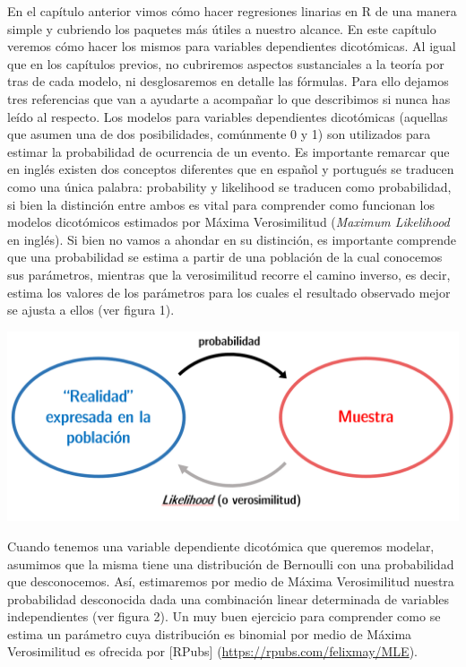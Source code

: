 \documentclass[]{book}
\begin{document}
En el capítulo anterior vimos cómo hacer regresiones linarias en R de
una manera simple y cubriendo los paquetes más útiles a nuestro alcance.
En este capítulo veremos cómo hacer los mismos para variables
dependientes dicotómicas. Al igual que en los capítulos previos, no
cubriremos aspectos sustanciales a la teoría por tras de cada modelo, ni
desglosaremos en detalle las fórmulas. Para ello dejamos tres
referencias que van a ayudarte a acompañar lo que describimos si nunca
has leído al respecto. Los modelos para variables dependientes
dicotómicas (aquellas que asumen una de dos posibilidades, comúnmente 0
y 1) son utilizados para estimar la probabilidad de ocurrencia de un
evento. Es importante remarcar que en inglés existen dos conceptos
diferentes que en español y portugués se traducen como una única
palabra: probability y likelihood se traducen como probabilidad, si bien
la distinción entre ambos es vital para comprender como funcionan los
modelos dicotómicos estimados por Máxima Verosimilitud (\emph{Maximum
Likelihood} en inglés). Si bien no vamos a ahondar en su distinción, es
importante comprende que una probabilidad se estima a partir de una
población de la cual conocemos sus parámetros, mientras que la
verosimilitud recorre el camino inverso, es decir, estima los valores de
los parámetros para los cuales el resultado observado mejor se ajusta a
ellos (ver figura 1).

\includegraphics[width=1.2\linewidth]{00-images/fig_7_1}

Cuando tenemos una variable dependiente dicotómica que queremos modelar,
asumimos que la misma tiene una distribución de Bernoulli con una
probabilidad que desconocemos. Así, estimaremos por medio de Máxima
Verosimilitud nuestra probabilidad desconocida dada una combinación
linear determinada de variables independientes (ver figura 2). Un muy
buen ejercicio para comprender como se estima un parámetro cuya
distribución es binomial por medio de Máxima Verosimilitud es ofrecida
por {[}RPubs{]} (\url{https://rpubs.com/felixmay/MLE}).
\end{document}
